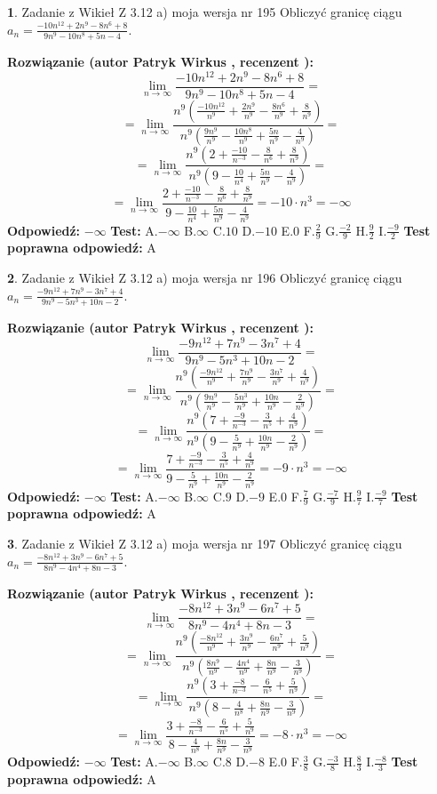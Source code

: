 \documentclass[12pt, a4paper]{article}
\theoremstyle{definition} %
\newtheorem{zad}{}
\newcommand{\zadStart}[1]{\begin{zad}#1\newline}
\newcommand{\zadStop}{\end{zad}}
\newcommand{\rozwStart}[2]{\noindent \textbf{Rozwiązanie (autor #1 , recenzent #2): }\newline}
\newcommand{\rozwStop}{\newline}
\newcommand{\odpStart}{\noindent \textbf{Odpowiedź:}\newline}
\newcommand{\odpStop}{\newline}
\newcommand{\testStart}{\noindent \textbf{Test:}\newline}
\newcommand{\testStop}{\newline}
\newcommand{\kluczStart}{\noindent \textbf{Test poprawna odpowiedź:}\newline}
\newcommand{\kluczStop}{\newline}
\begin{document}
\zadStart{Zadanie z Wikieł Z 3.12 a) moja wersja nr 195}
Obliczyć granicę ciągu $a_{n}=\frac{-10n^{12}+2n^{9}-8n^{6}+8}{9n^{9}-10n^{8}+5n-4}$.
\zadStop
\rozwStart{Patryk Wirkus}{}
$$\lim\limits_{n\to\infty}\frac{-10n^{12}+2n^{9}-8n^{6}+8}{9n^{9}-10n^{8}+5n-4}=$$
$$=\lim\limits_{n\to\infty}\frac{n^{9}\left(\frac{-10n^{12}}{n^{9}}+\frac{2n^{9}}{n^{9}}-\frac{8n^{6}}{n^{9}}+\frac{8}{n^{9}}\right)}{n^{9}\left(\frac{9n^{9}}{n^{9}}-\frac{10n^{8}}{n^{9}}+\frac{5n}{n^{9}}-\frac{4}{n^{9}}\right)}=$$
$$=\lim\limits_{n\to\infty}\frac{n^{9}\left(2+\frac{-10}{n^{-3}}-\frac{8}{n^{6}}+\frac{8}{n^{9}}\right)}
{n^{9}\left(9-\frac{10}{n^{4}}+\frac{5n}{n^{9}}-\frac{4}{n^{9}}\right)}=$$
$$=\lim\limits_{n\to\infty}\frac{2+\frac{-10}{n^{-3}}-\frac{8}{n^{6}}+\frac{8}{n^{9}}}{9-\frac{10}{n^{4}}+\frac{5n}{n^{9}}-\frac{4}{n^{9}}}=-10\cdot n^{3} = -\infty$$
\rozwStop
\odpStart
$-\infty$
\odpStop
\testStart
A.$-\infty$
B.$\infty$
C.$10$
D.$-10$
E.$0$
F.$\frac{2}{9}$
G.$\frac{-2}{9}$
H.$\frac{9}{2}$
I.$\frac{-9}{2}$
\testStop
\kluczStart
A
\kluczStop



\zadStart{Zadanie z Wikieł Z 3.12 a) moja wersja nr 196}
Obliczyć granicę ciągu $a_{n}=\frac{-9n^{12}+7n^{9}-3n^{7}+4}{9n^{9}-5n^{3}+10n-2}$.
\zadStop
\rozwStart{Patryk Wirkus}{}
$$\lim\limits_{n\to\infty}\frac{-9n^{12}+7n^{9}-3n^{7}+4}{9n^{9}-5n^{3}+10n-2}=$$
$$=\lim\limits_{n\to\infty}\frac{n^{9}\left(\frac{-9n^{12}}{n^{9}}+\frac{7n^{9}}{n^{9}}-\frac{3n^{7}}{n^{9}}+\frac{4}{n^{9}}\right)}{n^{9}\left(\frac{9n^{9}}{n^{9}}-\frac{5n^{3}}{n^{9}}+\frac{10n}{n^{9}}-\frac{2}{n^{9}}\right)}=$$
$$=\lim\limits_{n\to\infty}\frac{n^{9}\left(7+\frac{-9}{n^{-3}}-\frac{3}{n^{5}}+\frac{4}{n^{9}}\right)}
{n^{9}\left(9-\frac{5}{n^{9}}+\frac{10n}{n^{9}}-\frac{2}{n^{9}}\right)}=$$
$$=\lim\limits_{n\to\infty}\frac{7+\frac{-9}{n^{-3}}-\frac{3}{n^{5}}+\frac{4}{n^{9}}}{9-\frac{5}{n^{9}}+\frac{10n}{n^{9}}-\frac{2}{n^{9}}}=-9\cdot n^{3} = -\infty$$
\rozwStop
\odpStart
$-\infty$
\odpStop
\testStart
A.$-\infty$
B.$\infty$
C.$9$
D.$-9$
E.$0$
F.$\frac{7}{9}$
G.$\frac{-7}{9}$
H.$\frac{9}{7}$
I.$\frac{-9}{7}$
\testStop
\kluczStart
A
\kluczStop



\zadStart{Zadanie z Wikieł Z 3.12 a) moja wersja nr 197}
Obliczyć granicę ciągu $a_{n}=\frac{-8n^{12}+3n^{9}-6n^{7}+5}{8n^{9}-4n^{4}+8n-3}$.
\zadStop
\rozwStart{Patryk Wirkus}{}
$$\lim\limits_{n\to\infty}\frac{-8n^{12}+3n^{9}-6n^{7}+5}{8n^{9}-4n^{4}+8n-3}=$$
$$=\lim\limits_{n\to\infty}\frac{n^{9}\left(\frac{-8n^{12}}{n^{9}}+\frac{3n^{9}}{n^{9}}-\frac{6n^{7}}{n^{9}}+\frac{5}{n^{9}}\right)}{n^{9}\left(\frac{8n^{9}}{n^{9}}-\frac{4n^{4}}{n^{9}}+\frac{8n}{n^{9}}-\frac{3}{n^{9}}\right)}=$$
$$=\lim\limits_{n\to\infty}\frac{n^{9}\left(3+\frac{-8}{n^{-3}}-\frac{6}{n^{5}}+\frac{5}{n^{9}}\right)}
{n^{9}\left(8-\frac{4}{n^{8}}+\frac{8n}{n^{9}}-\frac{3}{n^{9}}\right)}=$$
$$=\lim\limits_{n\to\infty}\frac{3+\frac{-8}{n^{-3}}-\frac{6}{n^{5}}+\frac{5}{n^{9}}}{8-\frac{4}{n^{8}}+\frac{8n}{n^{9}}-\frac{3}{n^{9}}}=-8\cdot n^{3} = -\infty$$
\rozwStop
\odpStart
$-\infty$
\odpStop
\testStart
A.$-\infty$
B.$\infty$
C.$8$
D.$-8$
E.$0$
F.$\frac{3}{8}$
G.$\frac{-3}{8}$
H.$\frac{8}{3}$
I.$\frac{-8}{3}$
\testStop
\kluczStart
A
\kluczStop
\end{document}
